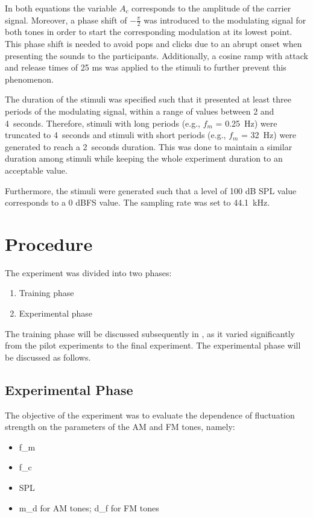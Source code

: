 \documentclass[../main.tex]{subfiles}
\begin{document}
In both equations the variable $A_c$ corresponds to the amplitude of the
carrier signal. Moreover, a phase shift of $-\frac{\pi}{2}$ was introduced to
the modulating signal for both tones in order to start the corresponding
modulation at its lowest point. This phase shift is needed to avoid pops and
clicks due to an abrupt onset when presenting the sounds to the participants.
Additionally, a cosine ramp with attack and release times of 25 ms was applied
to the stimuli to further prevent this phenomenon.

The duration of the stimuli was specified such that it presented at least three
periods of the modulating signal, within a range of values between 2 and
4~seconds. Therefore, stimuli with long periods (e.g., $f_m$ = 0.25~Hz) were
truncated to 4~seconds and stimuli with short periods (e.g., $f_m$ = 32~Hz) were
generated to reach a 2~seconds duration. This was done to maintain a similar
duration among stimuli while keeping the whole experiment duration to an
acceptable value.

Furthermore, the stimuli were generated such that a level of 100 dB SPL value
corresponds to a 0 dBFS value. The sampling rate was set to 44.1~kHz.

\section{Procedure}
\label{sec:procedure}

The experiment was divided into two phases:
\begin{enumerate}
  \item Training phase
  \item Experimental phase
\end{enumerate}

The training phase will be discussed subsequently in
, as it varied significantly from the pilot
experiments to the final experiment. The experimental phase will be discussed
as follows.

\subsection{Experimental Phase}


The objective of the experiment was to evaluate the dependence of fluctuation
strength on the parameters of the \gls{AM} and \gls{FM} tones, namely:
\begin{itemize}
  \item \Gls{f_m}
  \item \Gls{f_c}
  \item \Gls{SPL}
  \item \Gls{m_d} for \gls{AM} tones; \gls{d_f} for \gls{FM} tones
\end{itemize}
\end{document}
